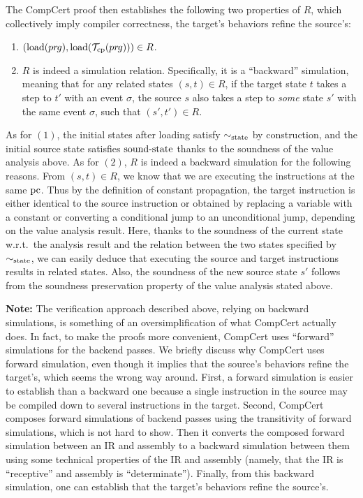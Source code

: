 The CompCert proof then establishes the following two properties of $R$, which collectively imply
compiler correctness, \ie{} the target's behaviors refine the source's:
%
\begin{enumerate}[{(1)}]

\item $(\mathrm{load}({pr\hspace*{-1pt}g}),\mathrm{load}(\mathcal{T}_\mathrm{cp}({pr\hspace*{-1pt}g})))\in R$.

\item $R$ is indeed a simulation relation.  Specifically, it is a ``backward'' simulation, meaning
  that for any related states $(s,t)\in R$, if the target state $t$ takes a step to $t'$ with an
  event $\sigma$, the source $s$ also takes a step to \emph{some} state $s'$ with the same event
  $\sigma$, such that $(s',t') \in R$.

\end{enumerate}
%
\vskip 0.2cm \noindent As for $(1)$, the initial states after loading satisfy $\sim_{\mathrm{state}}$ by
construction, and the initial source state satisfies $\mathrm{sound\text{-}state}$ thanks to the soundness of the
value analysis above.  As for $(2)$, $R$ is indeed a backward simulation for the following reasons.
From $(s,t)\in R$, we know that we are executing the instructions at the same $\mathrm{pc}$. Thus by the
definition of constant propagation, the target instruction is either identical to the source
instruction or obtained by replacing a variable with a constant or converting a conditional jump to
an unconditional jump, depending on the value analysis result.  Here, thanks to the soundness of the
current state w.r.t.\ the analysis result and the relation between the two states specified by
$\sim_{\mathrm{state}}$, we can easily deduce that executing the source and target instructions results in
related states.  Also, the soundness of the new source state $s'$ follows from the soundness
preservation property of the value analysis stated above.

\textbf{Note:} The verification approach described above, relying on backward simulations, is
something of an oversimplification of what CompCert actually does.  In fact, to make the proofs more
convenient, CompCert uses ``forward'' simulations for the backend passes.  We briefly discuss why
CompCert uses forward simulation, even though it implies that the source's behaviors refine the
target's, which seems the wrong way around.  First, a forward simulation is easier to establish than
a backward one because a single instruction in the source may be compiled down to several
instructions in the target. Second, CompCert composes forward simulations of backend passes using
the transitivity of forward simulations, which is not hard to show. Then it converts the composed
forward simulation between an IR and assembly to a backward simulation between them using some
technical properties of the IR and assembly (namely, that the IR is ``receptive'' and assembly is
``determinate''). Finally, from this backward simulation, one can establish that the target's
behaviors refine the source's.



